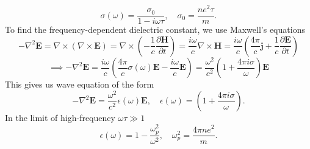 \documentclass{article}
\begin{document}
\begin{equation}
	\sigma(\omega) = \frac{\sigma_0}{1-i\omega \tau }, \quad \sigma_0 = \frac{ne^2 \tau}{m}.
\end{equation}
To find the frequency-dependent dielectric constant, we use Maxwell's equations
\begin{equation}
	-\nabla^2 \mathbf{E} = \nabla \times (\nabla \times \mathbf{E} ) = \nabla \times \left(-\frac{1}{c}\frac{\partial \mathbf{H}}{\partial  t} \right) = \frac{i\omega}{c} \nabla \times \mathbf{H} = \frac{i\omega}{c} \left(\frac{4\pi}{c}\mathbf{j}+ \frac{1}{c}\frac{\partial \mathbf{E}}{\partial  t} \right)
\end{equation}
\begin{equation}
	\implies -\nabla^2 \mathbf{E} = \frac{i\omega}{c} \left(\frac{4\pi}{c}\sigma(\omega) \mathbf{E} - \frac{i\omega}{c}  \mathbf{E}  \right) = \frac{\omega^2}{c^2} \left(1 + \frac{4\pi i \sigma}{\omega}  \right)\mathbf{E}
\end{equation}
This gives us wave equation of the form 
\begin{equation}
	-\nabla^2 \mathbf{E} =  \frac{\omega^2}{c^2}\epsilon (\omega)\mathbf{E}, \quad \epsilon(\omega) = \left(1 + \frac{4\pi i \sigma}{\omega}  \right).
\end{equation}
In the limit of high-frequency $\omega \tau \gg 1$
\begin{equation}
\epsilon(\omega) = 1 - \frac{\omega_p ^2}{\omega^2}, \quad \omega_p ^2 = \frac{4\pi n e^2}{m}.
\end{equation}
\end{document}
